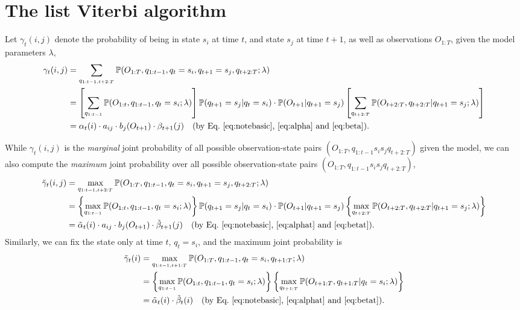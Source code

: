 \section{The list Viterbi algorithm}
\label{sec:lva}

Let $\gamma_t(i,j)$ denote the probability of being in state $s_i$ at time $t$, and state $s_j$ at time $t\!+\!1$, 
as well as observations $O_{1:T}$, given the model parameters $\lambda$, \ie
\begin{equation}
\label{eq:gamma}
\begin{aligned}
\gamma_t(i,j) 
&= \sum_{q_{1:t-1,t+2:T}} \mathbb{P}(O_{1:T}, q_{1:t-1}, q_t = s_i, q_{t+1} = s_j, q_{t+2:T} ;\lambda) \\
&= \left[ \sum_{q_{1:t-1}} \mathbb{P}(O_{1:t}, q_{1:t-1}, q_t = s_i ;\lambda) \right] \mathbb{P}(q_{t+1} = s_j |q_t = s_i) \cdot \mathbb{P}(O_{t+1} |q_{t+1} = s_j) 
   \left[ \sum_{q_{t+2:T}} \mathbb{P}(O_{t+2:T}, q_{t+2:T} |q_{t+1} = s_j; \lambda) \right] \\
&= \alpha_t(i) \cdot a_{ij} \cdot b_j(O_{t+1}) \cdot \beta_{t+1}(j) 
   ~~~ \text{(by Eq.~\ref{eq:notebasic}, \ref{eq:alpha} and \ref{eq:beta})}.
\end{aligned}
\end{equation}

While $\gamma_t(i,j)$ is the \emph{marginal} joint probability of all possible observation-state pairs 
$(O_{1:T}, q_{1:t-1} s_i s_j q_{t+2:T})$ given the model,
we can also compute the \emph{maximum} joint probability over all possible observation-state pairs $(O_{1:T}, q_{1:t-1} s_i s_j q_{t+2:T})$, \ie
\begin{equation}
\label{eq:gammat}
\begin{aligned}
\tilde{\gamma}_t(i,j) 
&= \max_{q_{1:t-1,t+2:T}} \mathbb{P}(O_{1:T}, q_{1:t-1}, q_t = s_i, q_{t+1} = s_j, q_{t+2:T} ;\lambda) \\
&= \left\{ \max_{q_{1:t-1}} \mathbb{P}(O_{1:t}, q_{1:t-1}, q_t = s_i ;\lambda) \right\} \mathbb{P}(q_{t+1} = s_j |q_t = s_i) \cdot \mathbb{P}(O_{t+1} |q_{t+1} = s_j) 
   \left\{ \max_{q_{t+2:T}} \mathbb{P}(O_{t+2:T}, q_{t+2:T} |q_{t+1} = s_j; \lambda) \right\} \\
&= \tilde{\alpha}_t(i) \cdot a_{ij} \cdot b_j(O_{t+1}) \cdot \tilde{\beta}_{t+1}(j) 
   ~~~ \text{(by Eq.~\ref{eq:notebasic}, \ref{eq:alphat} and \ref{eq:betat})}.
\end{aligned}
\end{equation}
Similarly, we can fix the state only at time $t$, \ie $q_t = s_i$, 
and the maximum joint probability is
\begin{equation}
\label{eq:gammat0}
\begin{aligned}
\tilde{\gamma}_t(i) 
&= \max_{q_{1:t-1,t+1:T}} \mathbb{P}(O_{1:T}, q_{1:t-1}, q_t = s_i, q_{t+1:T} ;\lambda) \\
&= \left\{ \max_{q_{1:t-1}} \mathbb{P}(O_{1:t}, q_{1:t-1}, q_t = s_i ;\lambda) \right\}  
   \left\{ \max_{q_{t+1:T}} \mathbb{P}(O_{t+1:T}, q_{t+1:T} |q_t = s_i; \lambda) \right\} \\
&= \tilde{\alpha}_t(i) \cdot \tilde{\beta}_t(i) 
   ~~~ \text{(by Eq.~\ref{eq:notebasic}, \ref{eq:alphat} and \ref{eq:betat})}.
\end{aligned}
\end{equation}

